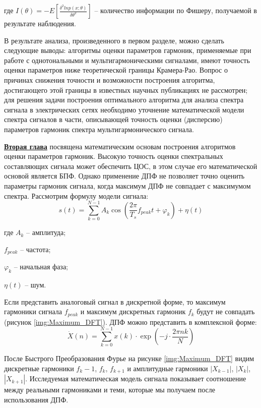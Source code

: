 где $I(\theta)=-E\left[\frac{\delta^2 ln p(x;\theta)}{\delta\theta^2}\right]$ -- количество информации по Фишеру, получаемой в результате наблюдения.

В результате анализа, произведенного в первом разделе, можно сделать следующие выводы:
алгоритмы оценки параметров гармоник, применяемые при работе с однотональными и мультигармоническими сигналами, имеют точность оценки параметров ниже теоретической границы Крамера-Рао. Вопрос о причинах снижения точности и возможности построения алгоритма, достигающего этой границы в известных научных публикациях не рассмотрен; 
для решения задачи построения оптимального алгоритма для анализа спектра сигнала в электрических сетях необходимо уточнение математической модели спектра сигналов в части, описывающей точность оценки (дисперсию) параметров гармоник спектра мультигармонического сигнала. 

\underline{\textbf{Вторая глава}} посвящена математическим основам построения алгоритмов оценки параметров гармоник.
Высокую точность оценки спектральных составляющих сигнала может
обеспечить ЦОС, в этом случае его математической
основой является БПФ. Однако применение ДПФ не позволяет точно оценить параметры гармоник сигнала, когда
максимум ДПФ не совпадает с максимумом спектра. Рассмотрим формулу модели сигнала:	
\begin{equation}
	\label{eq:equation3}
	s(t) = \displaystyle\sum_{k=0}^{N-1} A_k \cos \left({\frac{2 \pi}{T_s} f_{peak} t  + \varphi_k} \right)+ \eta(t)  
\end{equation}

где $A_k$ -- амплитуда;

$f_{peak}$ -- частота;

$\varphi_k$ -- начальная фаза;

$\eta(t)$ -- шум. 

Если представить аналоговый сигнал в дискретной форме, то 
максимум гармоники сигнала $f_{peak}$ и максимум дискретных гармоник $f_k$ будут не совпадать (рисунок \ref{img:Maximum_DFT}). ДПФ можно представить в комплексной форме:
\begin{equation}
	\label{eq:equation4}
	\dot{X}(n)= \displaystyle\sum_{k=0}^{N-1} x(k) \cdot \exp\left( -j \cdot \frac{2 \pi n k}{N}\right)
\end{equation}  

После Быстрого Преобразования Фурье на рисунке \ref{img:Maximum_DFT} видим дискретные гармоники $f_k-1$, $f_k$, $f_{k+1}$ и амплитудные гармоники $|X_{k-1}|$, $|X_k|$, $|X_{k+1}|$. Исследуемая математическая модель сигнала показывает соотношение между реальными гармониками и теми, которые мы получаем после использования ДПФ. 


